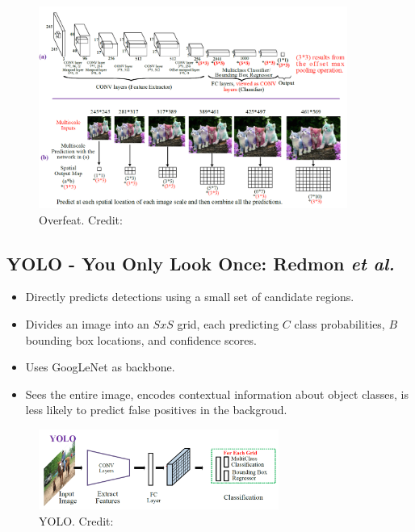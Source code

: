 \documentclass{beamer}
\begin{document}
\begin{frame}{}
	\begin{figure}
		\centering
		\includegraphics[width=0.9\textwidth]{images/overfeat.png}
		\caption{Overfeat.
			\hbox{\scriptsize Credit:}}
	\end{figure}
\end{frame}


\subsection{YOLO - You Only Look Once: Redmon \it{et al.} \cite{redmon_you_2016}}
\begin{frame}{}
	\begin{itemize}
		\item Directly predicts detections using a small set of candidate regions.
		\item Divides an image into an $S x S$ grid, each predicting $C$ class probabilities, $B$ bounding box locations, and confidence scores.
		\item Uses GoogLeNet as backbone.
		\item Sees the entire image, encodes contextual information about object classes, is less likely to predict false positives in the backgroud.
	\end{itemize}
	\begin{figure}
		\centering
		\includegraphics[width=0.7\textwidth]{images/yolo.png}
		\caption{YOLO.
			\hbox{\scriptsize Credit:}}
	\end{figure}
\end{frame}
\end{document}
